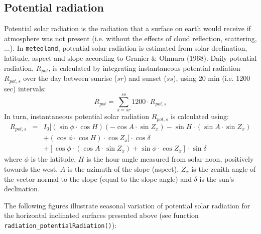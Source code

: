 \documentclass[11pt,a4paper]{article}
\begin{document}
\subsection{Potential radiation}
Potential solar radiation is the radiation that a surface on earth would receive if atmosphere was not present (i.e. without the effects of cloud reflection, scattering, ...). In \texttt{meteoland}, potential solar radiation is estimated from solar declination, latitude, aspect and slope according to Granier \& Ohmura (1968). Daily potential radiation, $R_{pot}$, is calculated by integrating instantaneous potential radiation $R_{pot,s}$ over the day between sunrise ($sr$) and sunset ($ss$), using 20 min (i.e. 1200 sec) intervals:
\begin{equation}
R_{pot} = \sum_{s = sr}^{ss}{1200 \cdot R_{pot,s}}
\end{equation}
In turn, instantaneous potential solar radiation $R_{pot,s}$ is calculated using:
\begin{eqnarray}
R_{pot,s} &=& I_0 [(\sin{\phi}\cdot \cos{H})(-\cos{A}\cdot \sin{Z_x})  -\sin{H}\cdot (\sin{A}\cdot \sin{Z_x}) \nonumber \\
 & & + (\cos{\phi}\cdot \cos{H})\cdot \cos{Z_x}]\cdot \cos{\delta} \nonumber \\
 & & + [\cos{\phi}\cdot (\cos{A}\cdot \sin{Z_x})+ \sin{\phi}\cdot \cos{Z_x}]\cdot \sin{\delta}
\end{eqnarray}
where $\phi$ is the latitude, $H$ is the hour angle measured from solar noon, positively towards the west, $A$ is the azimuth of the slope (aspect), $Z_x$ is the zenith angle of the vector normal to the slope (equal to the slope angle) and $\delta$ is the sun's declination.

The following figures illustrate seasonal variation of potential solar radiation for the horizontal inclinated surfaces presented above (see function \texttt{radiation\_potentialRadiation()}):
\end{document}
